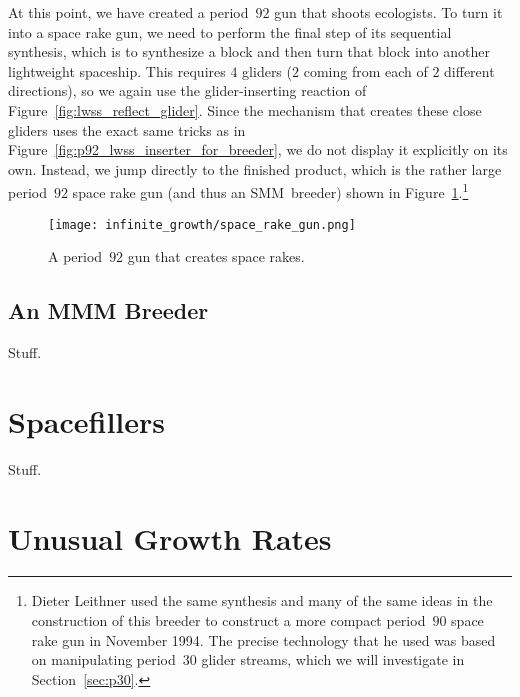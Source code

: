At this point, we have created a period~$92$ gun that shoots ecologists. To turn it into a space rake gun, we need to perform the final step of its sequential synthesis, which is to synthesize a block and then turn that block into another lightweight spaceship. This requires $4$ gliders ($2$ coming from each of $2$ different directions), so we again use the glider-inserting reaction of Figure~\ref{fig:lwss_reflect_glider}. Since the mechanism that creates these close gliders uses the exact same tricks as in Figure~\ref{fig:p92_lwss_inserter_for_breeder}, we do not display it explicitly on its own. Instead, we jump directly to the finished product, which is the rather large period~$92$ space rake gun (and thus an SMM~breeder) shown in Figure~\ref{fig:space_rake_gun}.\footnote{Dieter Leithner used the same synthesis and many of the same ideas in the construction of this breeder to construct a more compact period~$90$ space rake gun in November 1994. The precise technology that he used was based on manipulating period~$30$ glider streams, which we will investigate in Section~\ref{sec:p30}.}
\begin{figure}[!ht]
	\centering\texttt{[image: infinite\_growth/space\_rake\_gun.png]}
	\caption{A period~$92$ gun that creates space rakes.}\label{fig:space_rake_gun}
\end{figure}


\subsection{An MMM Breeder}\label{sec:mmm_breeder}

Stuff.





\section{Spacefillers}\label{sec:spacefillers}

Stuff.


\section{Unusual Growth Rates}\label{sec:growth_rates}


